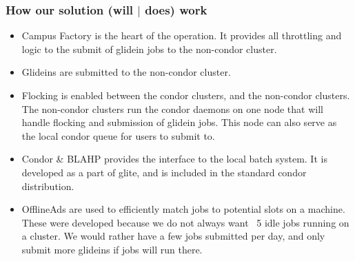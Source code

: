 \documentclass[11pt]{article}
\begin{document}
\subsubsection*{How our solution (will $|$ does) work}
\begin{itemize}




\item Campus Factory is the heart of the operation.  It provides all throttling and logic to the submit of glidein jobs to the non-condor cluster.

\item Glideins are submitted to the non-condor cluster.

\item Flocking is enabled between the condor clusters, and the non-condor clusters.  The non-condor clusters run the condor daemons on one node that will handle flocking and submission of glidein jobs.  This node can also serve as the local condor queue for users to submit to.  

\item Condor \& BLAHP provides the interface to the local batch system.  It is developed as a part of glite, and is included in the standard condor distribution.  

\item OfflineAds are used to efficiently match jobs to potential slots on a machine.  These were developed because we do not always want ~5 idle jobs running on a cluster.  We would rather have a few jobs submitted per day, and only submit more glideins if jobs will run there.

\end{itemize}
\end{document}
